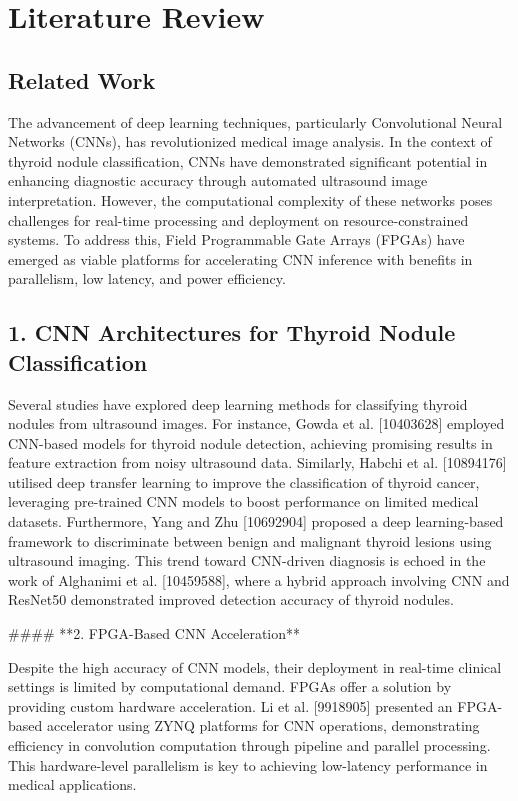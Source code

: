 \section{Literature Review}

\noindent

\subsection{Related Work}
 The advancement of deep learning techniques, particularly Convolutional Neural Networks (CNNs), has revolutionized medical image analysis. In the context of thyroid nodule classification, CNNs have demonstrated significant potential in enhancing diagnostic accuracy through automated ultrasound image interpretation. However, the computational complexity of these networks poses challenges for real-time processing and deployment on resource-constrained systems. To address this, Field Programmable Gate Arrays (FPGAs) have emerged as viable platforms for accelerating CNN inference with benefits in parallelism, low latency, and power efficiency.

\subsection{1. CNN Architectures for Thyroid Nodule Classification}
Several studies have explored deep learning methods for classifying thyroid nodules from ultrasound images. For instance, Gowda et al. [10403628] employed CNN-based models for thyroid nodule detection, achieving promising results in feature extraction from noisy ultrasound data. Similarly, Habchi et al. [10894176] utilised deep transfer learning to improve the classification of thyroid cancer, leveraging pre-trained CNN models to boost performance on limited medical datasets.
Furthermore, Yang and Zhu [10692904] proposed a deep learning-based framework to discriminate between benign and malignant thyroid lesions using ultrasound imaging. This trend toward CNN-driven diagnosis is echoed in the work of Alghanimi et al. [10459588], where a hybrid approach involving CNN and ResNet50 demonstrated improved detection accuracy of thyroid nodules.

#### **2. FPGA-Based CNN Acceleration**

Despite the high accuracy of CNN models, their deployment in real-time clinical settings is limited by computational demand. FPGAs offer a solution by providing custom hardware acceleration. Li et al. [9918905] presented an FPGA-based accelerator using ZYNQ platforms for CNN operations, demonstrating efficiency in convolution computation through pipeline and parallel processing. This hardware-level parallelism is key to achieving low-latency performance in medical applications.


